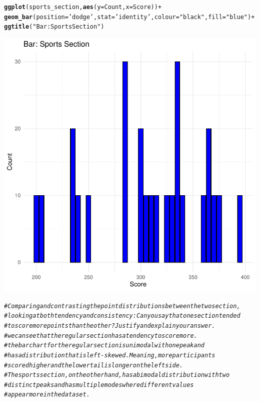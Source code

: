 \documentclass{article}\usepackage[]{graphicx}\usepackage[]{xcolor}
\makeatletter
\newcommand{\hlstr}[1]{\textcolor[rgb]{0.192,0.494,0.8}{#1}}%
\newcommand{\hlcom}[1]{\textcolor[rgb]{0.678,0.584,0.686}{\textit{#1}}}%
\newcommand{\hlopt}[1]{\textcolor[rgb]{0,0,0}{#1}}%
\newcommand{\hlstd}[1]{\textcolor[rgb]{0.345,0.345,0.345}{#1}}%
\newcommand{\hlkwc}[1]{\textcolor[rgb]{0.333,0.667,0.333}{#1}}%
\newcommand{\hlkwd}[1]{\textcolor[rgb]{0.737,0.353,0.396}{\textbf{#1}}}%
\newenvironment{kframe}{%
 \def\at@end@of@kframe{}%
 \ifinner\ifhmode%
  \def\at@end@of@kframe{\end{minipage}}%
  \begin{minipage}{\columnwidth}%
 \fi\fi%
 \def\FrameCommand##1{\hskip\@totalleftmargin \hskip-\fboxsep
 \colorbox{shadecolor}{##1}\hskip-\fboxsep
     \hskip-\linewidth \hskip-\@totalleftmargin \hskip\columnwidth}%
 \MakeFramed {\advance\hsize-\width
   \@totalleftmargin\z@ \linewidth\hsize
   \@setminipage}}%
 {\par\unskip\endMakeFramed%
 \at@end@of@kframe}
\newenvironment{knitrout}{}{} %
\makeatother
\begin{document}
\begin{knitrout}
{}


\begin{kframe}\begin{alltt}
\hlkwd{ggplot}\hlstd{(sports_section,} \hlkwd{aes}\hlstd{(}\hlkwc{y}\hlstd{=Count,}\hlkwc{x}\hlstd{=Score))} \hlopt{+}
  \hlkwd{geom_bar}\hlstd{(}\hlkwc{position} \hlstd{=} \hlstr{'dodge'}\hlstd{,} \hlkwc{stat}\hlstd{=}\hlstr{'identity'}\hlstd{,}\hlkwc{colour}\hlstd{=}\hlstr{"black"}\hlstd{,}\hlkwc{fill}\hlstd{=}\hlstr{"blue"}\hlstd{)} \hlopt{+}
  \hlkwd{ggtitle}\hlstd{(}\hlstr{"Bar: Sports Section"}\hlstd{)}
\end{alltt}
\end{kframe}

{\centering \includegraphics[width=.6\linewidth]{figure/week4-assignment-01-Couto-Maria-Rnwauto-report-4} 

}


\begin{kframe}\begin{alltt}
\hlcom{# Comparing and contrasting the point distributions between the two section, }
\hlcom{# looking at both tendency and consistency: Can you say that one section tended }
\hlcom{# to score more points than the other? Justify and explain your answer.}
  \hlcom{# we can see that the regular section has a tendency to score more.}
  \hlcom{# the bar chart for the regular section is unimodal with one peak and}
  \hlcom{# has a distribution that is left -skewed. Meaning, more participants}
  \hlcom{# scored higher and the lower tail is longer on the left side.}
  \hlcom{# The sports section,on the other hand, has a bimodal distribution with two }
  \hlcom{# distinct peaks and has multiple modes where different values}
  \hlcom{# appear more in the dataset. }



\end{alltt}
\end{kframe}
\end{knitrout}
\end{document}
